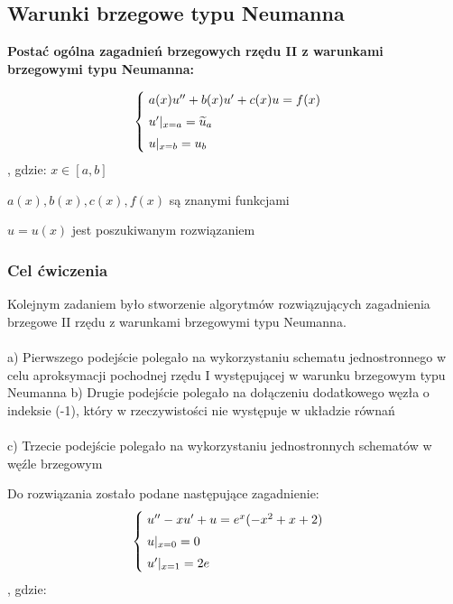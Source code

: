\subsection{Warunki brzegowe typu Neumanna}
\textbf{Postać ogólna zagadnień brzegowych rzędu II z warunkami brzegowymi typu Neumanna:}

\[
\begin{cases}
\vspace{0.1cm} 
\hspace{0,1cm} a(x) u'' + b(x)u' + c(x)u =f(x) \\
\vspace{0.1cm}
\hspace{0,1cm}u'|_{x=a} = \widetilde{u}_{a} \\
\hspace{0,1cm}u|_{x=b} = u_{b}
\end{cases}
\]
, gdzie:
$x\in[a,b]$

$a(x), b(x), c(x), f(x)$ są znanymi funkcjami

$u = u(x)$ jest poszukiwanym rozwiązaniem
\newline

\subsubsection{Cel ćwiczenia}
Kolejnym zadaniem było stworzenie algorytmów rozwiązujących zagadnienia brzegowe II rzędu z warunkami brzegowymi typu Neumanna.
\\\\
a) Pierwszego podejście polegało na wykorzystaniu schematu jednostronnego w celu aproksymacji pochodnej rzędu I występującej w warunku brzegowym typu Neumanna
\newpage
b) Drugie podejście polegało na dołączeniu dodatkowego węzła o indeksie (-1), który w rzeczywistości nie występuje w układzie równań
\\\\
c) Trzecie podejście polegało na wykorzystaniu jednostronnych schematów w węźle brzegowym

Do rozwiązania zostało podane następujące zagadnienie:
\[
\begin{cases}
\vspace{0.1cm} 
\hspace{0,1cm}u''-xu' + u=e^x(-x^2+x+2) \\
\vspace{0.1cm}
\hspace{0,1cm}u|_{x=0}=0 \\
\hspace{0,1cm}u'|_{x=1}=2e
\end{cases}
\]
, gdzie:

